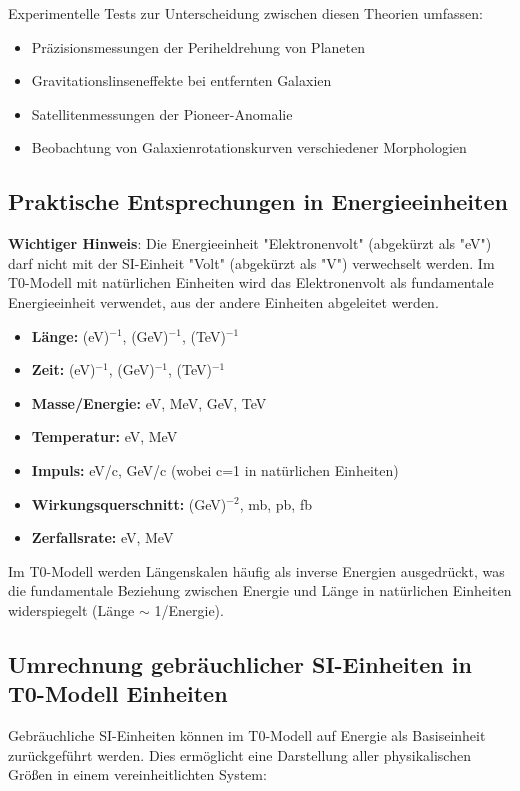 \documentclass[12pt,a4paper]{article}
\begin{document}
Experimentelle Tests zur Unterscheidung zwischen diesen Theorien umfassen:
\begin{itemize}
	\item Präzisionsmessungen der Periheldrehung von Planeten
	\item Gravitationslinseneffekte bei entfernten Galaxien
	\item Satellitenmessungen der Pioneer-Anomalie
	\item Beobachtung von Galaxienrotationskurven verschiedener Morphologien
\end{itemize}

\subsection*{Praktische Entsprechungen in Energieeinheiten}

\textbf{Wichtiger Hinweis}: Die Energieeinheit "Elektronenvolt" (abgekürzt als "eV") darf nicht mit der SI-Einheit "Volt" (abgekürzt als "V") verwechselt werden. Im T0-Modell mit natürlichen Einheiten wird das Elektronenvolt als fundamentale Energieeinheit verwendet, aus der andere Einheiten abgeleitet werden.

\begin{itemize}
	\item \textbf{Länge:} (eV)$^{-1}$, (GeV)$^{-1}$, (TeV)$^{-1}$
	\item \textbf{Zeit:} (eV)$^{-1}$, (GeV)$^{-1}$, (TeV)$^{-1}$
	\item \textbf{Masse/Energie:} eV, MeV, GeV, TeV
	\item \textbf{Temperatur:} eV, MeV
	\item \textbf{Impuls:} eV/c, GeV/c (wobei c=1 in natürlichen Einheiten)
	\item \textbf{Wirkungsquerschnitt:} (GeV)$^{-2}$, mb, pb, fb
	\item \textbf{Zerfallsrate:} eV, MeV
\end{itemize}

Im T0-Modell werden Längenskalen häufig als inverse Energien ausgedrückt, was die fundamentale Beziehung zwischen Energie und Länge in natürlichen Einheiten widerspiegelt (Länge $\sim$ 1/Energie).

\subsection*{Umrechnung gebräuchlicher SI-Einheiten in T0-Modell Einheiten}

Gebräuchliche SI-Einheiten können im T0-Modell auf Energie als Basiseinheit zurückgeführt werden. Dies ermöglicht eine Darstellung aller physikalischen Größen in einem vereinheitlichten System:
\end{document}
